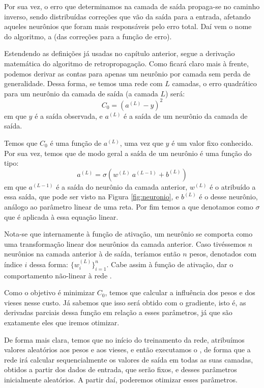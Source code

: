 Por sua vez, o erro que determinamos na camada de saída propaga-se no caminho inverso, sendo distribuídas correções que vão da saída para a entrada, afetando aqueles neurônios que foram mais responsáveis pelo erro total. Daí vem o nome do algoritmo, a  (das correções para a função de erro).

Estendendo as definições já usadas no capítulo anterior, segue a derivação matemática do algoritmo de retropropagação. Como ficará claro mais à frente, podemos derivar as contas para apenas um neurônio por camada sem perda de generalidade. Dessa forma, se temos uma rede com $L$ camadas, o erro quadrático para um neurônio da camada de saída (a camada $L$) será:
\begin{equation}\label{retro:custo}
C_0 = (a^{(L)} - y)^2
\end{equation}
em que $y$ é a saída observada, e $a^{(L)}$ é a saída de um neurônio da camada de saída.

Temos que $C_0$ é uma função de $a^{(L)}$, uma vez que $y$ é um valor fixo conhecido. Por sua vez, temos que de modo geral a saída de um neurônio é uma função do tipo:
\begin{equation}\label{retro:neuron}
a^{(L)} = \sigma(w^{(L)}~a^{(L-1)} + b^{(L)})
\end{equation}
em que $a^{(L-1)}$ é a saída do neurônio da camada anterior, $w^{(L)}$ é o  atribuído a essa saída, que pode ser visto na Figura \ref{fig:neuronio}, e $b^{(L)}$ é o  desse neurônio, análogo ao parâmetro linear de uma reta. Por fim temos a  que denotamos como $\sigma$ que é aplicada à essa equação linear.

Nota-se que internamente à função de ativação, um neurônio se comporta como uma transformação linear dos neurônios da camada anterior. Caso tivéssemos $n$ neurônios na camada anterior à de saída, teríamos então $n$ pesos, denotados com índice $i$ dessa forma: $\{ w_i^{(L)} \}_{i=1}^n$. Cabe assim à função de ativação, dar o comportamento não-linear à rede .

Como o objetivo é minimizar $C_0$, temos que calcular a influência dos pesos e dos vieses nesse custo. Já sabemos que isso será obtido com o gradiente, isto é, as derivadas parciais dessa função em relação a esses parâmetros, já que são exatamente eles que iremos otimizar. 

De forma mais clara, temos que no início do treinamento da rede, atribuímos valores aleatórios aos pesos e aos vieses, e então executamos o , de forma que a rede irá calcular sequencialmente os valores de saída em todas as suas camadas, obtidos a partir dos dados de entrada, que serão fixos, e desses parâmetros inicialmente aleatórios. A partir daí, poderemos otimizar esses parâmetros.


